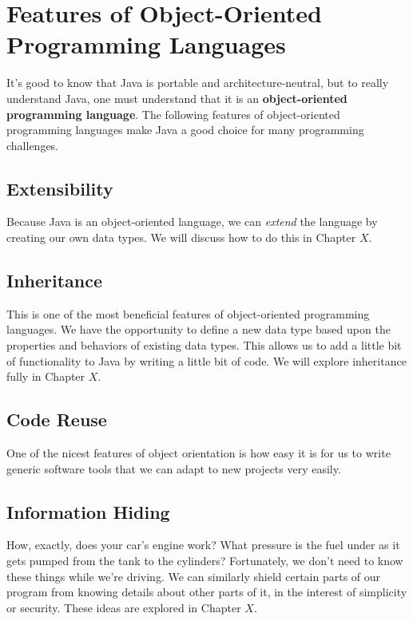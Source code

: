 \section{Features of Object-Oriented Programming Languages}

It's good to know that Java is portable and architecture-neutral, but to really understand Java, one must understand that it is an \textbf{object-oriented programming language}.  The following features of object-oriented programming languages make Java a good choice for many programming challenges.

\subsection{Extensibility}

Because Java is an object-oriented language, we can \textit{extend} the language by creating our own data types.  We will discuss how to do this in Chapter $X$.

\subsection{Inheritance}

This is one of the most beneficial features of object-oriented programming languages.  We have the opportunity to define a new data type based upon the properties and behaviors of existing data types.  This allows us to add a little bit of functionality to Java by writing a little bit of code.  We will explore inheritance fully in Chapter $X$.

\subsection{Code Reuse}

One of the nicest features of object orientation is how easy it is for us to write generic software tools that we can adapt to new projects very easily.

\subsection{Information Hiding}

How, exactly, does your car's engine work?  What pressure is the fuel under as it gets pumped from the tank to the cylinders?  Fortunately, we don't need to know these things while we're driving.  We can similarly shield certain parts of our program from knowing details about other parts of it, in the interest of simplicity or security.  These ideas are explored in Chapter $X$.

